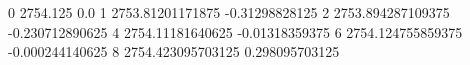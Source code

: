 0 2754.125 0.0
1 2753.81201171875 -0.31298828125
2 2753.894287109375 -0.230712890625
4 2754.11181640625 -0.01318359375
6 2754.124755859375 -0.000244140625
8 2754.423095703125 0.298095703125
